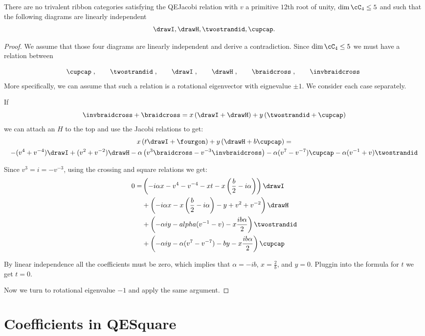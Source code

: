 \documentclass[12pt]{amsart}
\begin{document}
\begin{proposition}
There are no trivalent ribbon categories satisfying the QEJacobi relation with $v$ a primitive $12$th root of unity, $\dim \cC_4 \leq 5$ and such that the following diagrams are linearly independent
\[\drawI, \drawH, \twostrandid, \cupcap.\]
\end{proposition}
\begin{proof}
We assume that those four diagrams are linearly independent and derive a contradiction.  Since $\dim \cC_4 \leq 5$ we must have a relation between


 \[
  \cupcap\;,\qquad\twostrandid\;,
    \qquad\drawI\;,\qquad\drawH\;,\qquad\braidcross\;,\qquad \invbraidcross\;
   \]
More specifically, we can assume that such a relation is a rotational eigenvector with eignevalue $\pm 1$.  We consider each case separately.

If
\[\invbraidcross + \braidcross = x\left(\drawI + \drawH\right) + y \left(\twostrandid+\cupcap\right)\]
we can attach an $H$ to the top and use the Jacobi relations to get:
\begin{multline*}
x \left(t \drawI + \fourgon \right) + y \left(\drawH + b \cupcap \right) = \\ - (v^4 + v^{-4}) \drawI + (v^2 + v^{-2}) \drawH - \alpha \left(v^3 \braidcross - v^{-3} \invbraidcross \right) - \alpha(v^7-v^{-7}) \cupcap - \alpha (v^{-1} + v) \twostrandid
\end{multline*}

Since $v^3 = i = -v^{-3}$, using the crossing and square relations we get:
\begin{align*}
0 = &\left(-i \alpha x -v^4 -v^{-4} - x t - x \left(\frac{b}{2} - i \alpha \right)  \right) \drawI \\
& + \left(-i \alpha x -x \left(\frac{b}{2} - i \alpha\right) - y + v^2 + v^{-2} \right) \drawH \\
& + \left(-\alpha i y -alpha(v^{-1}-v) - x \frac{i b \alpha}{2}\right) \twostrandid \\
& + \left( -\alpha i y - \alpha (v^7-v^{-7}) - b y - x \frac{i b \alpha}{2} \right) \cupcap \\
\end{align*}

By linear independence all the coefficients must be zero, which implies that $\alpha = -i b$, $x = \frac{2}{b}$, and $y=0$.  Pluggin into the formula for $t$ we get $t=0$.



Now we turn to rotational eigenvalue $-1$ and apply the same argument.


\end{proof}



\appendix
\section{Coefficients in QESquare}
\label{app:coefficients}

\nn{}

\renewcommand*{\bibfont}{\small}
\setlength{\bibitemsep}{0pt}
\raggedright
\printbibliography
\end{document}
